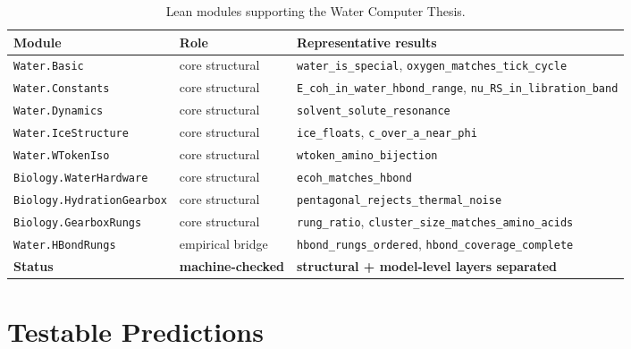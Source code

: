 \documentclass[12pt,a4paper]{article}
\theoremstyle{definition}
\theoremstyle{remark}
\begin{document}
\begin{table}[ht]
\centering
\caption{Lean modules supporting the Water Computer Thesis.}
\label{tab:lean_modules}
\small
\begin{tabular}{@{}lll@{}}
\toprule
Module & Role & Representative results \\
\midrule
\texttt{Water.Basic} & core structural &
  \texttt{water\_is\_special}, \texttt{oxygen\_matches\_tick\_cycle} \\
\texttt{Water.Constants} & core structural &
  \texttt{E\_coh\_in\_water\_hbond\_range}, \texttt{nu\_RS\_in\_libration\_band} \\
\texttt{Water.Dynamics} & core structural &
  \texttt{solvent\_solute\_resonance} \\
\texttt{Water.IceStructure} & core structural &
  \texttt{ice\_floats}, \texttt{c\_over\_a\_near\_phi} \\
\texttt{Water.WTokenIso} & core structural &
  \texttt{wtoken\_amino\_bijection} \\
\texttt{Biology.WaterHardware} & core structural &
  \texttt{ecoh\_matches\_hbond} \\
\texttt{Biology.HydrationGearbox} & core structural &
  \texttt{pentagonal\_rejects\_thermal\_noise} \\
\texttt{Biology.GearboxRungs} & core structural &
  \texttt{rung\_ratio}, \texttt{cluster\_size\_matches\_amino\_acids} \\
\texttt{Water.HBondRungs} & empirical bridge &
  \texttt{hbond\_rungs\_ordered}, \texttt{hbond\_coverage\_complete} \\
\midrule
\textbf{Status} & \textbf{machine-checked} & \textbf{structural + model-level layers separated} \\
\bottomrule
\end{tabular}
\end{table}

\section{Testable Predictions}
\label{sec:predictions}
\end{document}
